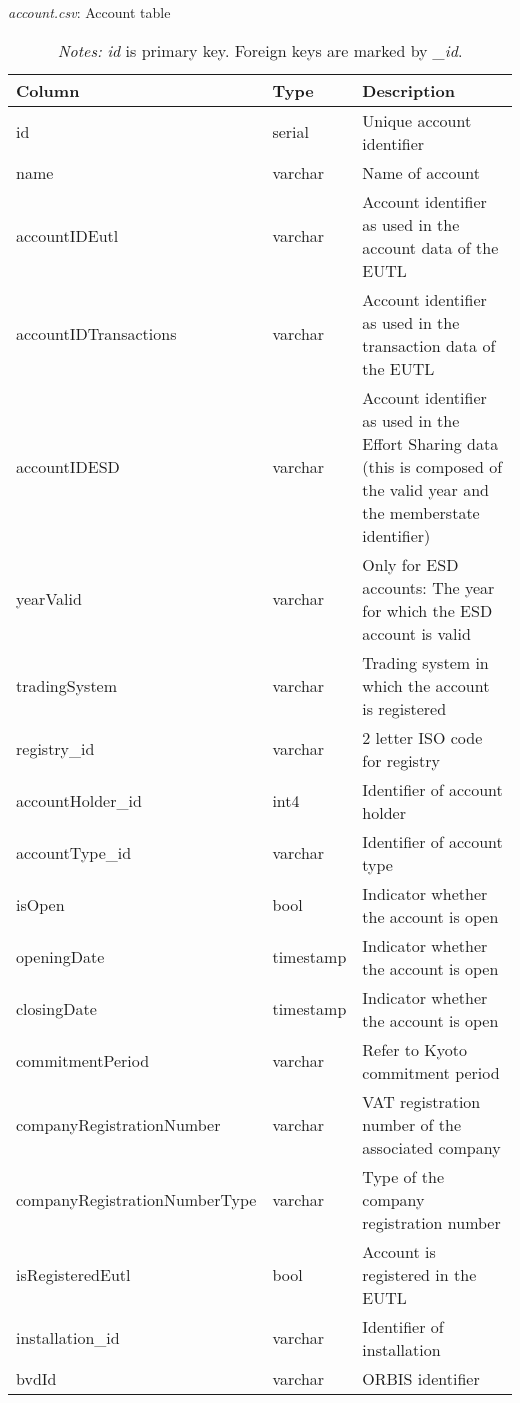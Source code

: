 \documentclass[authoryear]{elsarticle}
\begin{document}
\begin{table}[htbp]\scriptsize
	\caption{\textit{account.csv}: Account table}\label{tab:tbl_account}
	\centering
	\begin{tabular*}{\textwidth}{@{}@{\extracolsep{\fill}} lll @{}}
		\toprule
		\toprule
		\textbf{Column } & \textbf{Type} & \textbf{Description}\\
		\midrule
		id    & serial & Unique account identifier \\
		name  & varchar & Name of account \\
		accountIDEutl& varchar & Account identifier as used in the account data of the EUTL \\
		accountIDTransactions& varchar & Account identifier as used in the transaction data of the EUTL \\
		accountIDESD& varchar & Account identifier as used in the Effort Sharing data (this is composed of the valid year and the memberstate identifier) \\
		yearValid& varchar & Only for ESD accounts: The year for which the ESD account is valid \\
		tradingSystem & varchar & Trading system in which the account is registered\\
		registry\_id & varchar & 2 letter ISO code for registry \\
		accountHolder\_id & int4  & Identifier of account holder \\
		accountType\_id & varchar & Identifier of account type \\
		isOpen & bool  & Indicator whether the account is open  \\
		openingDate & timestamp & Indicator whether the account is open  \\
		closingDate & timestamp & Indicator whether the account is open  \\
		commitmentPeriod & varchar & Refer to Kyoto commitment period \\
		companyRegistrationNumber & varchar & VAT registration number of the associated company \\
		companyRegistrationNumberType & varchar & Type of the company registration number \\
		isRegisteredEutl & bool  & Account is registered in the EUTL \\
		installation\_id & varchar & Identifier of installation \\
		bvdId & varchar & ORBIS identifier \\
		\bottomrule
		\bottomrule
	\end{tabular*}%
	\vspace{-3ex}
\caption*{\footnotesize \emph{Notes:} \textit{id} is primary key. Foreign keys are marked by \textit{\_id}.}
\vspace{0ex}
\end{table}
\end{document}
